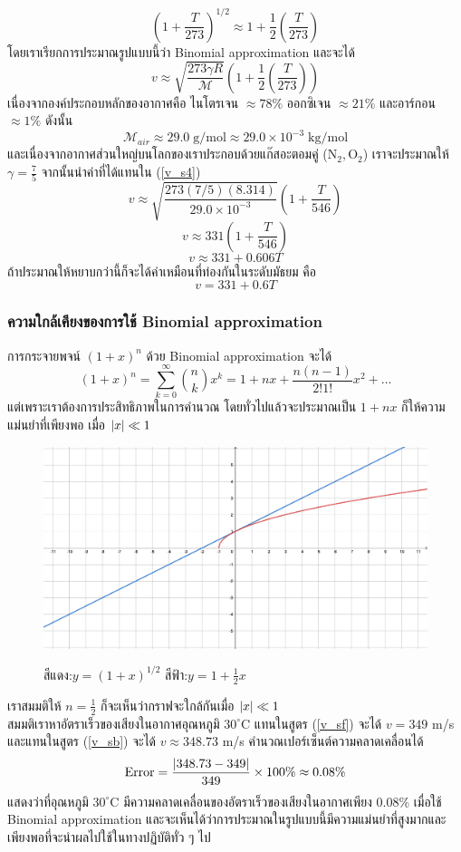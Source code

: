 \documentclass[a4paper,12pt]{article}
\begin{document}
	$$\left(1+\frac{T}{273}\right)^{1/2}\approx1+\frac{1}{2}\left(\frac{T}{273}\right)$$
	โดยเราเรียกการประมาณรูปแบบนี้ว่า Binomial approximation และจะได้
	\begin{equation}\label{v_s4}
	v\approx\sqrt{\frac{273\gamma R}{\mathcal{M}}}\left(1+\frac{1}{2}\left(\frac{T}{273}\right)\right)
	\end{equation}
	เนื่องจากองค์ประกอบหลักของอากาศคือ ไนโตรเจน $\approx 78\%$ ออกซิเจน $\approx 21\%$ และอาร์กอน $\approx 1\%$ ดังนั้น
	$$\mathcal{M}_{air}\approx29.0\;\mathrm{g/mol}\approx29.0\times10^{-3}\;\mathrm{kg/mol}$$
	และเนื่องจากอากาศส่วนใหญ่บนโลกของเราประกอบด้วยแก๊สอะตอมคู่ ($\mathrm{N_2,O_2}$) เราจะประมาณให้ $\gamma=\frac{7}{5}$
	จากนั้นนำค่าที่ได้แทนใน (\ref{v_s4})
	$$v\approx\sqrt{\frac{273(7/5)(8.314)}{29.0\times10^{-3}}}\left(1+\frac{T}{546}\right)$$
	$$v\approx331\left(1+\frac{T}{546}\right)$$
	$$v\approx331+0.606T$$
	ถ้าประมาณให้หยาบกว่านี้ก็จะได้ค่าเหมือนที่ท่องกันในระดับมัธยม คือ
	\begin{equation}\label{v_sf}
	\boxed{
	v=331+0.6T
	}
	\end{equation}
	\subsubsection{ความใกล้เคียงของการใช้ Binomial approximation}
	การกระจายพจน์ $(1+x)^n$ ด้วย Binomial approximation จะได้
	\begin{equation}
	(1+x)^n=\sum_{k=0}^{\infty}{n\choose k}x^k=1+nx+\frac{n(n-1)}{2!1!}x^2+\dots
	\end{equation}
	แต่เพราะเราต้องการประสิทธิภาพในการคำนวณ โดยทั่วไปแล้วจะประมาณเป็น $1+nx$ ก็ให้ความแม่นยำที่เพียงพอ เมื่อ $\abs{x}\ll1$\\
	\begin{figure}[h]
		\centering
		\includegraphics[width=0.8\linewidth]{plot_binomial}	
		\label{fig:plot2}
		\caption{สีแดง:$y=(1+x)^{1/2}$ สีฟ้า:$y=1+\frac{1}{2}x$}
	\end{figure}
\linebreak
	เราสมมติให้ $n=\frac{1}{2}$ ก็จะเห็นว่ากราฟจะใกล้กันเมื่อ $\abs{x}\ll1$\\
	\indent สมมติเราหาอัตราเร็วของเสียงในอากาศอุณหภูมิ $30^\circ \mathrm{C}$
	แทนในสูตร (\ref{v_sf}) จะได้ $v= 349$ m/s และแทนในสูตร (\ref{v_sb}) จะได้ $v\approx 348.73$ m/s คำนวณเปอร์เซ็นต์ความคลาดเคลื่อนได้
	$$\mathrm{Error}=\frac{\abs{348.73-349}}{349}\times100\%\approx 0.08\%$$
	แสดงว่าที่อุณหภูมิ $30^\circ \mathrm{C}$ มีความคลาดเคลื่อนของอัตราเร็วของเสียงในอากาศเพียง 0.08\% เมื่อใช้ \\Binomial approximation และจะเห็นได้ว่าการประมาณในรูปแบบนี้มีความแม่นยำที่สูงมากและเพียงพอที่จะนำผลไปใช้ในทางปฏิบัติทั่ว ๆ ไป
\end{document}

